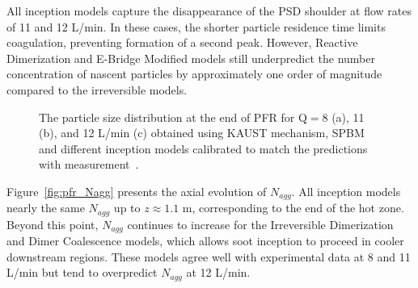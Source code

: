 All inception models capture the disappearance of the PSD shoulder at flow rates of 11 and 12 L/min. In these cases, the shorter particle residence time limits coagulation, preventing formation of a second peak. However, Reactive Dimerization and E-Bridge Modified models still underpredict the number concentration of nascent particles by approximately one order of magnitude compared to the irreversible models.




\begin{figure}[H]
	\centering
	\caption{The particle size distribution at the end of PFR for $\mathrm{Q}=8$ (a), 11 (b), and 12 L/min (c) obtained using KAUST mechanism, SPBM and different inception models calibrated to match the predictions with measurement~\citep{mei2019quantitative}.}
	\label{fig:pfr_psd} 
\end{figure}

Figure~\ref{fig:pfr_Nagg} presents the axial evolution of $N_{agg}$. All inception models nearly the same $N_{agg}$ up to $z \approx 1.1$ m, corresponding to the end of the hot zone. Beyond this point, $N_{agg}$ continues to increase for the Irreversible Dimerization and Dimer Coalescence models, which allows soot inception to proceed in cooler downstream regions. These models agree well with experimental data at 8 and 11 L/min but tend to overpredict $N_{agg}$ at 12 L/min.

